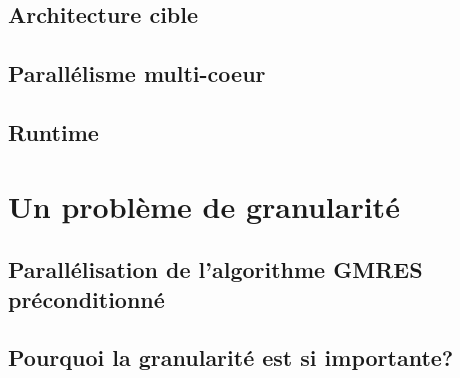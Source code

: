 \documentclass[oneside,12t]{classes/Thesis}
\begin{document}
\section{Architecture cible}



%



\section{Parallélisme multi-coeur}






\section{Runtime}





\chapter{Un problème de granularité}
\minitoc
\vspace{1cm}
\section{Parallélisation de l'algorithme GMRES préconditionné}



\section{Pourquoi la granularité est si importante?}


\end{document}
